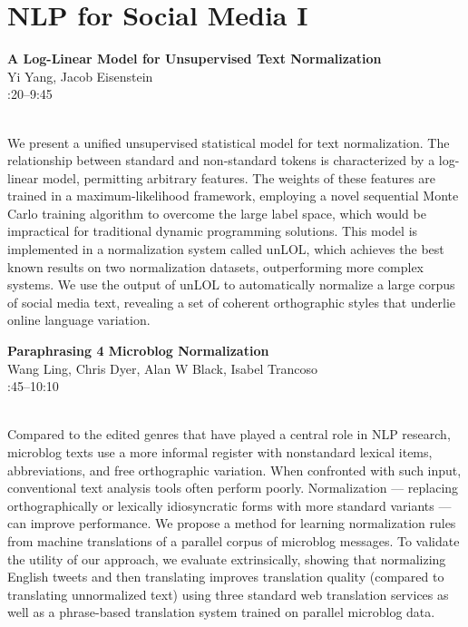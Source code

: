 \documentclass[twoside,makeidx]{book}
\renewcommand{\normalsize}{\fontsize{8}{9}\selectfont}
\renewcommand{\small}{\fontsize{7}{8}\selectfont}
\begin{document}
\section{NLP for Social Media I}
\vspace{-1em}
\par\vspace{2em}\noindent%
\begin{minipage}{\linewidth}%
\begin{center}
\textbf{\normalsize A Log-Linear Model for Unsupervised Text Normalization}\\
\normalsize  Yi Yang,  Jacob Eisenstein\\
{\small 9:20--9:45}\\
\end{center}
\end{minipage}\\[0.5em]
\nopagebreak%
\noindent%
{\small We present a unified unsupervised statistical model for text normalization. The relationship between standard and non-standard tokens is characterized by a log-linear model, permitting arbitrary features.  The weights of these features are trained in a maximum-likelihood framework, employing a novel sequential Monte Carlo training algorithm to overcome the large label space, which would be impractical for traditional dynamic programming solutions. This model is implemented in a normalization system called unLOL, which achieves the best known results on two normalization datasets, outperforming more complex systems. We use the output of unLOL to automatically normalize a large corpus of social media text, revealing a set of coherent orthographic styles that underlie online language variation.}
\par\vspace{2em}\noindent%
\begin{minipage}{\linewidth}%
\begin{center}
\textbf{\normalsize Paraphrasing 4 Microblog Normalization}\\
\normalsize  Wang Ling,  Chris Dyer,  Alan W Black,  Isabel Trancoso\\
{\small 9:45--10:10}\\
\end{center}
\end{minipage}\\[0.5em]
\nopagebreak%
\noindent%
{\small Compared to the edited genres that have played a central role in NLP research, microblog texts use a more informal register with nonstandard lexical items, abbreviations, and free orthographic variation. When confronted with such input, conventional text analysis tools often perform poorly. Normalization --- replacing orthographically or lexically idiosyncratic forms with more standard variants --- can improve performance. We propose a method for learning normalization rules from machine translations of a parallel corpus of microblog messages. To validate the utility of our approach, we evaluate extrinsically, showing that normalizing English tweets and then translating improves translation quality (compared to translating unnormalized text) using three standard web translation services as well as a phrase-based translation system trained on parallel microblog data.}
\end{document}
